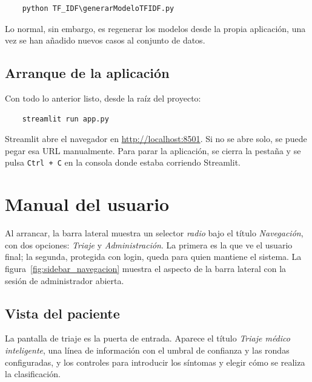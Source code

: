 \begin{verbatim}
	python TF_IDF\generarModeloTFIDF.py
\end{verbatim}

Lo normal, sin embargo, es regenerar los modelos desde la propia aplicación, una vez se han añadido nuevos casos al conjunto de datos.

\subsection*{Arranque de la aplicación}

Con todo lo anterior listo, desde la raíz del proyecto:

\begin{verbatim}
	streamlit run app.py
\end{verbatim}

Streamlit abre el navegador en \url{http://localhost:8501}. Si no se abre solo, se puede pegar esa URL manualmente. Para parar la aplicación, se cierra la pestaña y se pulsa \texttt{Ctrl + C} en la consola donde estaba corriendo Streamlit.

\section{Manual del usuario}

Al arrancar, la barra lateral muestra un selector \textit{radio} bajo el título \textit{Navegación}, con dos opciones: \textit{Triaje} y \textit{Administración}. La primera es la que ve el usuario final; la segunda, protegida con login, queda para quien mantiene el sistema. La figura~\ref{fig:sidebar_navegacion} muestra el aspecto de la barra lateral con la sesión de administrador abierta.


\subsection{Vista del paciente}

La pantalla de triaje es la puerta de entrada. Aparece el título \textit{Triaje médico inteligente}, una línea de información con el umbral de confianza y las rondas configuradas, y los controles para introducir los síntomas y elegir cómo se realiza la clasificación.


